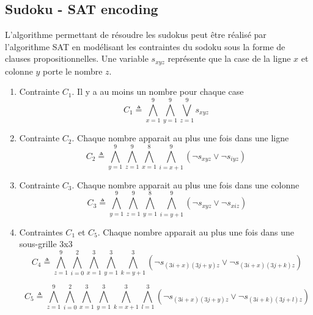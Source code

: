 \subsection{Sudoku - SAT encoding}
L'algorithme permettant de résoudre les sudokus peut être réalisé par l'algorithme SAT en modélisant
les contraintes du sodoku sous la forme de clauses propositionnelles. Une variable $s_{xyz}$ représente que la
case de la ligne $x$ et colonne $y$ porte le nombre $z$.
\begin{enumerate}
	\item Contrainte $C_1$. Il y a au moins un nombre pour chaque case 
	$$ C_1 \triangleq \bigwedge _{x=1}^9  \bigwedge _{y=1}^9 \bigvee  _{z=1}^9 s_{xyz}$$

	\item Contrainte $C_2$.  Chaque nombre apparait au plus une fois dans une ligne
	$$  C_2 \triangleq \bigwedge _{y=1}^9  \bigwedge _{z=1}^9 \bigwedge _{x=1}^8 \bigwedge _{i=x+1}^9  ( \lnot s_{xyz} \vee \lnot s_{iyz} ) $$

	\item  Contrainte $C_3$. Chaque nombre apparait au plus une fois dans une colonne
	$$ \ C_3 \triangleq \bigwedge _{y=1}^9  \bigwedge _{z=1}^9 \bigwedge _{y=1}^8 \bigwedge _{i=y+1}^9  ( \lnot s_{xyz} \vee \lnot s_{xiz} ) $$

	\item  Contraintes $C_1$ et $C_5$. Chaque nombre apparait au plus une fois dans une sous-grille 3x3
	$$ \ C_4 \triangleq \bigwedge _{z=1}^9  \bigwedge _{i=0}^2 \bigwedge _{x=1}^3
	 \bigwedge _{y=1}^3  \bigwedge _{k=y+1}^3  ( \lnot s_{(3i+x)(3j+y)z} \vee \lnot s_{(3i+x)(3j+k)z} ) $$

	$$ \ C_5 \triangleq \bigwedge _{z=1}^9  \bigwedge _{i=0}^2 \bigwedge _{x=1}^3
	 \bigwedge _{y=1}^3  \bigwedge _{k=x+1}^3  \bigwedge _{l=1}^3  ( \lnot s_{(3i+x)(3j+y)z} \vee \lnot s_{(3i+k)(3j+l)z} ) $$
\end{enumerate}
